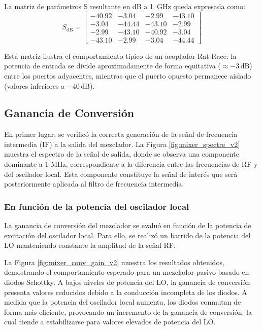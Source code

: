 La matriz de parámetros S resultante en dB a \SI{1}{\giga\hertz} queda expresada como:
\begin{equation}
    S_{\text{dB}} = \begin{bmatrix}
    -40.92 & -3.04 & -2.99 & -43.10 \\
    -3.04 & -44.44 & -43.10 & -2.99 \\
    -2.99 & -43.10 & -40.92 & -3.04 \\
    -43.10 & -2.99 & -3.04 & -44.44
    \end{bmatrix}
    \label{eq:rat_race_s_matrix}
\end{equation}

Esta matriz ilustra el comportamiento típico de un acoplador Rat-Race: la potencia de entrada se divide aproximadamente de forma equitativa ($\approx -3\,\text{dB}$) entre los puertos adyacentes, mientras que el puerto opuesto permanece aislado (valores inferiores a $-40\,\text{dB}$).

\subsection{Ganancia de Conversión}

En primer lugar, se verificó la correcta generación de la señal de frecuencia intermedia (IF) a la salida del mezclador. La Figura \ref{fig:mixer_spectre_v2} muestra el espectro de la señal de salida, donde se observa una componente dominante a 1 MHz, correspondiente a la diferencia entre las frecuencias de RF y del oscilador local.
Esta componente constituye la señal de interés que será posteriormente aplicada al filtro de frecuencia intermedia. 

\subsubsection{En función de la potencia del oscilador local}

La ganancia de conversión del mezclador se evaluó en función de la potencia de excitación del oscilador local. Para ello, se realizó un barrido de la potencia del LO manteniendo constante la amplitud de la señal RF.

La Figura \ref{fig:mixer_conv_gain_v2}  muestra los resultados obtenidos, demostrando el comportamiento esperado para un mezclador pasivo basado en diodos Schottky. A bajos niveles de potencia del LO, la ganancia de conversión presenta valores reducidos debido a la conducción incompleta de los diodos. A medida que la potencia del oscilador local aumenta, los diodos conmutan de forma más eficiente, provocando un incremento de la ganancia de conversión, la cual tiende a estabilizarse para valores elevados de potencia del LO.

